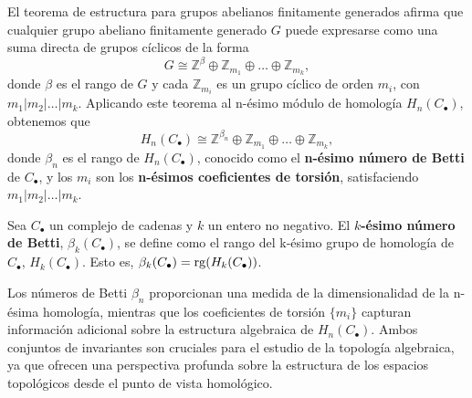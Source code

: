 El teorema de estructura para grupos abelianos finitamente generados afirma que
cualquier grupo abeliano finitamente generado \(G\) puede expresarse como una suma
directa de grupos cíclicos de la forma
\[
	G \cong \mathbb{Z}^{\beta}\oplus \mathbb{Z}_{m_1}\oplus \ldots \oplus \mathbb{Z}
	_{m_k},
\]
donde \(\beta\) es el rango de \(G\) y cada \(\mathbb{Z}_{m_i}\) es un grupo cíclico
de orden \(m_{i}\), con \(m_{1} | m_{2} | \ldots | m_{k}\). Aplicando este teorema
al n-ésimo módulo de homología \(H_{n}(C_{\bullet})\), obtenemos que
\[
	H_{n}(C_{\bullet}) \cong \mathbb{Z}^{\beta_n}\oplus \mathbb{Z}_{m_1}\oplus \ldots
	\oplus \mathbb{Z}_{m_k},
\]
donde \(\beta_{n}\) es el rango de \(H_{n}(C_{\bullet})\), conocido como el \textbf{n-ésimo
número de Betti} de \(C_{\bullet}\), y los \(m_{i}\) son los \textbf{n-ésimos
coeficientes de torsión}, satisfaciendo \(m_{1} | m_{2} | \ldots | m_{k}\).
\begin{definicion}
	Sea \(C_{\bullet}\) un complejo de cadenas y \(k\) un entero no negativo. El
	\textbf{\(k\)-ésimo número de Betti}, \(\beta_{k}(C_{\bullet})\), se define como el
	rango del k-ésimo grupo de homología de \(C_{\bullet}\), \(H_{k}(C_{\bullet})\). Esto
	es, \(\beta_{k}(C_{\bullet}) = \operatorname{rg}(H_{k}(C_{\bullet}))\).
\end{definicion}
Los números de Betti \(\beta_{n}\) proporcionan una medida de la dimensionalidad de
la n-ésima homología, mientras que los coeficientes de torsión \(\{m_{i}\}\)
capturan información adicional sobre la estructura algebraica de
\(H_{n}(C_{\bullet})\). Ambos conjuntos de invariantes son cruciales para el estudio
de la topología algebraica, ya que ofrecen una perspectiva profunda sobre la
estructura de los espacios topológicos desde el punto de vista homológico.
%

\endinput
